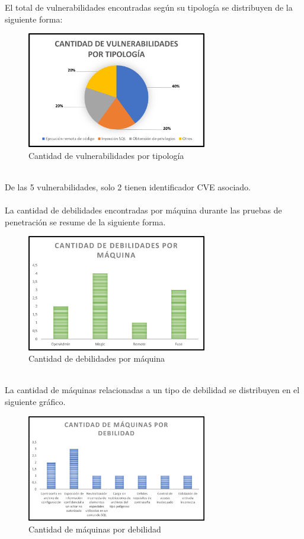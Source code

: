 \documentclass[a4paper]{article}
\begin{document}
\large{El total de vulnerabilidades encontradas según su tipología se distribuyen de la siguiente forma:}
\\
\begin{figure}[h]
    \centering
    \includegraphics[width=0.7\textwidth]{imagenes/vuln_x_tipo.png}
    \caption{Cantidad de vulnerabilidades por tipología}
\end{figure}
\\
\large{De las 5 vulnerabilidades, solo 2 tienen identificador CVE asociado.}
\\
\\
\large{La cantidad de debilidades encontradas por máquina durante las pruebas de penetración se resume de la siguiente forma.}
\begin{figure}[h]
    \centering
    \includegraphics[width=0.7\textwidth]{imagenes/deb_x_maq.png}
    \caption{Cantidad de debilidades por máquina}
\end{figure}
\\
\large{La cantidad de máquinas relacionadas a un tipo de debilidad se distribuyen en el siguiente gráfico.}
\\
\begin{figure}[h]
    \centering
    \includegraphics[width=0.7\textwidth]{imagenes/maq_x_deb.png}
    \caption{Cantidad de máquinas por debilidad}
\end{figure}
\end{document}
